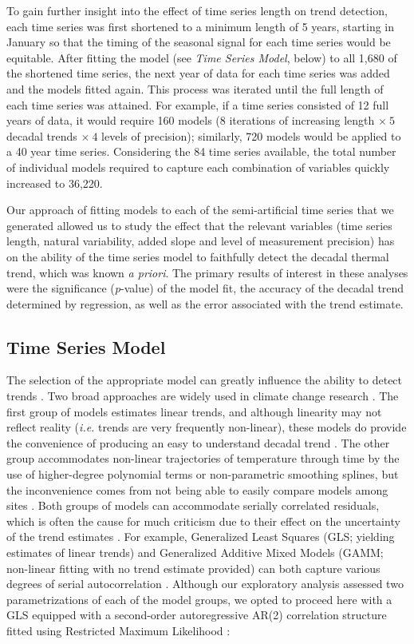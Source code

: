 \documentclass[twocol]{ametsoc}
\begin{document}
To gain further insight into the effect of time series length on trend detection, each time series was first shortened to a minimum length of 5 years, starting in January so that the timing of the seasonal signal for each time series would be equitable. After fitting the model (see \emph{Time Series Model}, below) to all 1,680 of the shortened time series, the next year of data for each time series was added and the models fitted again. This process was iterated until the full length of each time series was attained. For example, if a time series consisted of 12 full years of data, it would require 160 models (8 iterations of increasing length $\times~5$ decadal trends $\times~4$ levels of precision); similarly, 720 models would be applied to a 40 year time series. Considering the 84 time series available, the total number of individual models required to capture each combination of variables quickly increased to 36,220.

Our approach of fitting models to each of the semi-artificial time series that we generated allowed us to study the effect that the relevant variables (time series length, natural variability, added slope and level of measurement precision) has on the ability of the time series model to faithfully detect the decadal thermal trend, which was known \emph{a priori}. The primary results of interest in these analyses were the significance (\emph{p}-value) of the model fit, the accuracy of the decadal trend determined by regression, as well as the error associated with the trend estimate.

\subsection{Time Series Model}
The selection of the appropriate model can greatly influence the ability to detect trends \citep{Franzke2012}. Two broad approaches are widely used in climate change research \citep{IPCC2013}. The first group of models estimates linear trends, and although linearity may not reflect reality (\emph{i.e.} trends are very frequently non-linear), these models do provide the convenience of producing an easy to understand decadal trend \citep[\emph{e.g.} \SI{0.106}{\degreeCelsius}~dec$^{-1}$;][]{Wilks2011,IPCC2013}. The other group accommodates non-linear trajectories of temperature through time by the use of higher-degree polynomial terms or non-parametric smoothing splines, but the inconvenience comes from not being able to easily compare models among sites \citep{Wood2006,Scinocca2010}. Both groups of models can accommodate serially correlated residuals, which is often the cause for much criticism due to their effect on the uncertainty of the trend estimates \citep{vonStorch1999,Santer2008}. For example, Generalized Least Squares (GLS; yielding estimates of linear trends) and Generalized Additive Mixed Models (GAMM; non-linear fitting with no trend estimate provided) can both capture various degrees of serial autocorrelation \citep{pinheiro2006mixed,Wood2006}. Although our exploratory analysis assessed two parametrizations of each of the model groups, we opted to proceed here with a GLS equipped with a second-order autoregressive AR(2) correlation structure fitted using Restricted Maximum Likelihood \citep[REML;][]{pinheiro2006mixed}:
\end{document}
